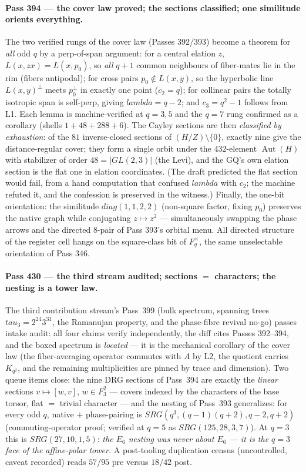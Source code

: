 \documentclass[12pt,a4paper]{article}
\def\mathbb#1{#1}%
\def\mathrm#1{#1}%
\def\textbf#1{#1}%
\def\lambda{lambda}%
\def\tau{tau}%
\theoremstyle{definition}
\newcommand{\FF}{\mathbb{F}}
\begin{document}
\paragraph{Pass 394 --- the cover law proved; the sections classified; one
similitude orients everything.}
The two verified rungs of the cover law (Passes 392/393) become a theorem for
\emph{all} odd $q$ by a perp-of-span argument: for a central elation $z$,
$L(x,zx)=L(x,p_0)$, so \emph{all} $q{+}1$ common neighbours of fiber-mates lie
in the rim (fibers antipodal); for cross pairs $p_0\notin L(x,y)$, so the
hyperbolic line $L(x,y)^\perp$ meets $p_0^\perp$ in exactly one point
($c_2=q$); for collinear pairs the totally isotropic span is self-perp, giving
$\lambda=q-2$; and $c_3=q^2-1$ follows from L1.  Each lemma is
machine-verified at $q=3,5$ and the $q=7$ rung confirmed as a corollary
(shells $1+48+288+6$).  The Cayley sections are then \emph{classified by
exhaustion}: of the $81$ inverse-closed sections of $(H/Z)\setminus\{0\}$,
exactly \textbf{nine} give the distance-regular cover; they form a single
orbit under the $432$-element $\operatorname{Aut}(H)$ with stabilizer of
order $48=|\mathrm{GL}(2,3)|$ (the Levi), and the GQ's own elation section is
the flat one in elation coordinates.  (The draft predicted the flat section
would fail, from a hand computation that confused $\lambda$ with $c_2$; the
machine refuted it, and the confession is preserved in the witness.)
Finally, the one-bit orientation: the similitude $\mathrm{diag}(1,1,2,2)$
(non-square factor, fixing $p_0$) preserves the native graph while
conjugating $z\mapsto z^2$ --- simultaneously swapping the phase arrows and
the directed $8$-pair of Pass 393's orbital menu.  All directed structure of
the register cell hangs on the square-class bit of $\FF_q^\times$, the same
unselectable orientation of Pass 346.

\paragraph{Pass 430 --- the third stream audited; sections $=$ characters; the
nesting is a tower law.}
The third contribution stream's Pass~399 (bulk spectrum, spanning trees
$\tau_3=2^{24}3^{31}$, the Ramanujan property, and the phase-fibre revival
no-go) passes intake audit: all four claims verify independently, the diff
cites Passes 392--394, and the boxed spectrum is \emph{located} --- it is the
mechanical corollary of the cover law (the fiber-averaging operator commutes
with $A$ by L2, the quotient carries $K_{q^2}$, and the remaining
multiplicities are pinned by trace and dimension).  Two queue items close:
the nine DRG sections of Pass~394 are exactly the \emph{linear} sections
$v\mapsto[w,v]$, $w\in\FF_3^2$ --- \textbf{covers indexed by the characters of
the base torsor}, flat $=$ trivial character --- and the nesting of Pass~393
generalizes: for every odd $q$, native $+$ phase-pairing is
$\mathrm{SRG}(q^3,(q{-}1)(q{+}2),q{-}2,q{+}2)$ (commuting-operator proof;
verified at $q=5$ as $\mathrm{SRG}(125,28,3,7)$).  At $q=3$ this is
$\mathrm{SRG}(27,10,1,5)$: \emph{the $E_6$ nesting was never about $E_6$ ---
it is the $q=3$ face of the affine-polar tower.}  A post-tooling duplication
census (uncontrolled, caveat recorded) reads $57/95$ pre versus $18/42$ post.
\end{document}
